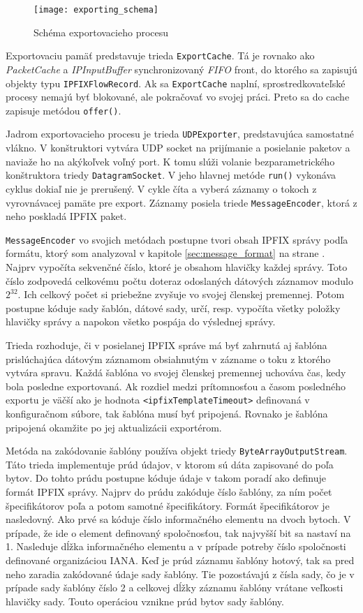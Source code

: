 \begin{figure}[ht!]
\centering
\texttt{[image: exporting\_schema]}
\caption{Schéma exportovacieho procesu}\label{o:exporting_schema}
\end{figure}

Exportovaciu pamäť predstavuje trieda \verb|ExportCache|. Tá je rovnako ako \emph{PacketCache} a 
\emph{IPInputBuffer} synchronizovaný \emph{FIFO} front, do ktorého sa zapisujú objekty typu 
\verb|IPFIXFlowRecord|. Ak sa \verb|ExportCache| naplní, sprostredkovateľské procesy nemajú byť blokované, 
ale pokračovať vo svojej práci. Preto sa do cache zapisuje metódou \verb|offer()|.

Jadrom exportovacieho procesu je trieda \verb|UDPExporter|, predstavujúca samostatné vlákno. V 
konštruktori vytvára UDP socket na prijímanie a posielanie paketov a naviaže ho na akýkoľvek voľný port.
K tomu slúži volanie bezparametrického konštruktora triedy \verb|DatagramSocket|. V jeho hlavnej metóde 
\verb|run()| vykonáva cyklus dokiaľ nie je prerušený. V cykle číta a vyberá záznamy o tokoch z 
vyrovnávacej pamäte pre export. Záznamy posiela triede \verb|MessageEncoder|, ktorá z neho poskladá 
IPFIX paket.

\verb|MessageEncoder| vo svojich metódach postupne tvori obsah IPFIX správy podľa formátu, ktorý som 
analyzoval v kapitole \ref{sec:message_format} na strane \pageref{sec:message_format}. Najprv vypočíta 
sekvenčné číslo, ktoré je obsahom hlavičky každej správy. Toto číslo zodpovedá celkovému počtu doteraz 
odoslaných dátových záznamov modulo $2^{32}$. Ich celkový počet si priebežne zvyšuje vo svojej členskej 
premennej. Potom postupne kóduje sady šablón, dátové sady, určí, resp. vypočíta všetky položky 
hlavičky správy a napokon všetko pospája do výslednej správy.

Trieda rozhoduje, či v posielanej IPFIX správe má byť zahrnutá aj šablóna prislúchajúca dátovým záznamom
obsiahnutým v zázname o toku z ktorého vytvára spravu. Každá šablóna vo svojej členskej premennej uchováva
čas, kedy bola posledne exportovaná. Ak rozdiel medzi prítomnosťou a časom posledného exportu je väčší ako 
je hodnota \verb|<ipfixTemplateTimeout>| definovaná v konfiguračnom súbore, tak šablóna musí byť pripojená.
Rovnako je šablóna pripojená okamžite po jej aktualizácii exportérom. 

Metóda na zakódovanie šablóny používa objekt triedy \verb|ByteArrayOutputStream|. Táto trieda 
implementuje prúd údajov, v ktorom sú dáta zapisované do poľa bytov. Do tohto prúdu postupne kóduje údaje 
v takom poradí ako definuje formát IPFIX správy. Najprv do prúdu zakóduje číslo šablóny, za ním 
počet špecifikátorov poľa a potom samotné špecifikátory. Formát špecifikátorov je nasledovný. Ako prvé sa 
kóduje číslo informačného elementu na dvoch bytoch. V prípade, že ide o element definovaný 
spoločnosťou, tak najvyšší bit sa nastaví na 1. Nasleduje dĺžka informačného elementu a v prípade potreby 
číslo spoločnosti definované organizáciou IANA. Keď je prúd záznamu šablóny hotový, tak sa pred neho 
zaradia zakódované údaje sady šablóny. Tie pozostávajú z čísla sady, čo je v prípade sady šablóny číslo 2
a celkovej dĺžky záznamu šablóny 
vrátane veľkosti hlavičky sady. Touto operáciou vznikne prúd bytov sady šablóny.


